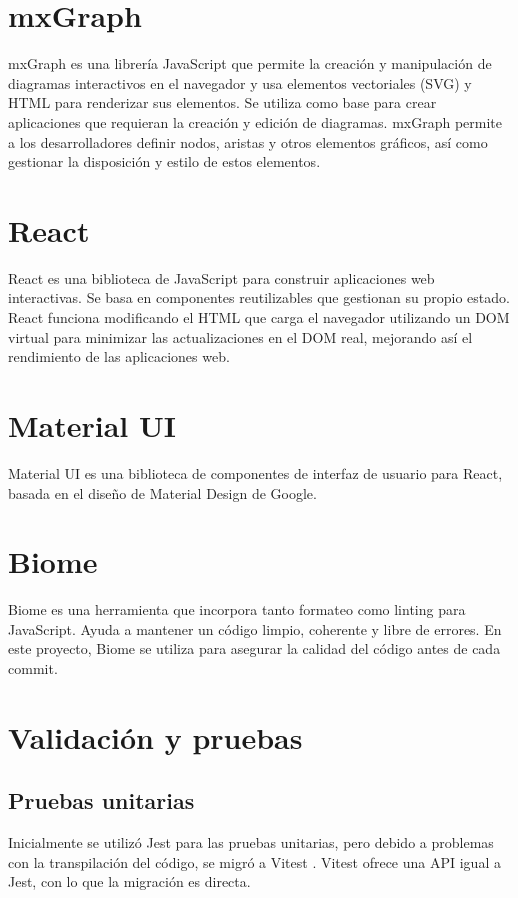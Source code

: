 
\section{mxGraph}
mxGraph \cite{mxgraph} es una librería JavaScript que permite la creación y manipulación de diagramas interactivos en el navegador y usa elementos vectoriales (SVG) y HTML para renderizar sus elementos. Se utiliza como base para crear aplicaciones que requieran la creación y edición de diagramas. mxGraph permite a los desarrolladores definir nodos, aristas y otros elementos gráficos, así como gestionar la disposición y estilo de estos elementos.

\section{React}
React \cite{react} es una biblioteca de JavaScript para construir aplicaciones web interactivas. Se basa en componentes reutilizables que gestionan su propio estado. React funciona modificando el HTML que carga el navegador utilizando un DOM virtual para minimizar las actualizaciones en el DOM real, mejorando así el rendimiento de las aplicaciones web.

\section{Material UI}
Material UI \cite{material-ui} es una biblioteca de componentes de interfaz de usuario para React, basada en el diseño de Material Design de Google.

\section{Biome}
Biome \cite{biome} es una herramienta que incorpora tanto formateo como linting para JavaScript. Ayuda a mantener un código limpio, coherente y libre de errores. En este proyecto, Biome se utiliza para asegurar la calidad del código antes de cada commit.

\section{Validación y pruebas}

\subsection{Pruebas unitarias}
Inicialmente se utilizó Jest \cite{jest} para las pruebas unitarias, pero debido a problemas con la transpilación del código, se migró a Vitest \cite{vitest}. Vitest ofrece una API igual a Jest, con lo que la migración es directa.

